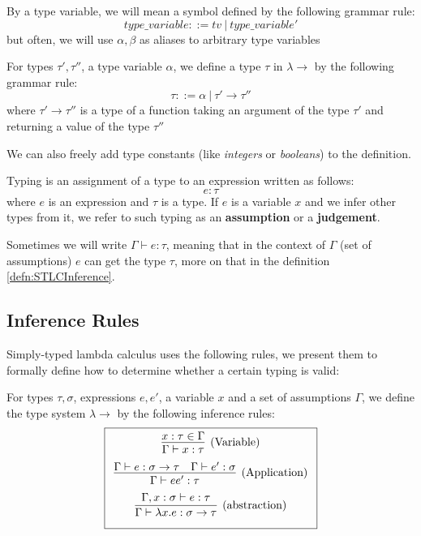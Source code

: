 \begin{defn}
    By a type variable, we will mean a symbol defined by the following grammar rule:
    $$type\_variable ::= tv\ |\ type\_variable'$$
    but often, we will use $\alpha, \beta$ as aliases to arbitrary type variables
\end{defn}

\begin{defn}
    \label{defn:typeSTLC}
    For types $\tau', \tau''$, a type variable $\alpha$, we define a type $\tau$ in $\lambda\rightarrow$ by the following grammar rule:
    $$\tau ::= \alpha\ |\ \tau' \rightarrow \tau''$$
    where $\tau' \rightarrow \tau''$ is a type of a function taking an argument of the type $\tau'$ and returning a value of the type $\tau''$
\end{defn}

We can also freely add type constants (like \emph{integers} or \emph{booleans}) to the definition.

\begin{defn}
    \label{defn:typingSTLC}
    Typing is an assignment of a type to an expression written as follows:
    $$e : \tau$$
    where $e$ is an expression and $\tau$ is a type. If $e$ is a variable $x$ and we infer other types from it, we refer to such typing as an \textbf{assumption} or a \textbf{judgement}.
\end{defn}

Sometimes we will write $\Gamma \vdash e : \tau$, meaning that in the context of $\Gamma$ (set of assumptions) $e$ can get the type $\tau$, more on that in the definition \ref{defn:STLCInference}.

\subsection{Inference Rules}

Simply-typed lambda calculus uses the following rules, we present them to formally define how to determine whether a certain typing is valid:

\begin{defn}
    \label{defn:STLCInference}
    For types $\tau, \sigma$, expressions $e, e'$, a variable $x$ and a set of assumptions $\Gamma$, we define the type system $\lambda\rightarrow$ by the following inference rules:
    $$\boxed{\renewcommand{\arraystretch}{2.2}\begin{array}{cl}
        \infer[\text{(Variable)}]{\Gamma \vdash x : \tau}{x : \tau \in \Gamma} \\
        \infer[(\text{Application})]{\Gamma \vdash e e' : \tau}{\Gamma \vdash e : \sigma \rightarrow \tau \quad \Gamma \vdash e' : \sigma} \\
        \infer[(\text{abstraction})]{\Gamma \vdash \lambda x . e : \sigma \rightarrow \tau}{\Gamma, x : \sigma \vdash e : \tau}
    \end{array}}$$
\end{defn}

